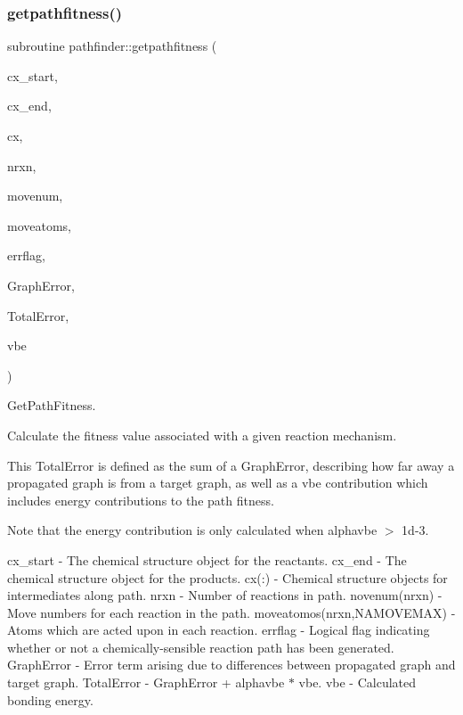 \subsubsection{\texorpdfstring{getpathfitness()}{getpathfitness()}}
{\footnotesize\ttfamily subroutine pathfinder\+::getpathfitness (\begin{DoxyParamCaption}\item[{type(\mbox{\hyperlink{structchemstr_1_1cxs}{cxs}})}]{cx\+\_\+start,  }\item[{type(\mbox{\hyperlink{structchemstr_1_1cxs}{cxs}})}]{cx\+\_\+end,  }\item[{type(\mbox{\hyperlink{structchemstr_1_1cxs}{cxs}}), dimension(nrxn)}]{cx,  }\item[{integer}]{nrxn,  }\item[{integer, dimension(nrxn)}]{movenum,  }\item[{integer, dimension(nrxn,namovemax)}]{moveatoms,  }\item[{logical}]{errflag,  }\item[{real(8)}]{Graph\+Error,  }\item[{real(8)}]{Total\+Error,  }\item[{real(8)}]{vbe }\end{DoxyParamCaption})}



Get\+Path\+Fitness. 

Calculate the fitness value associated with a given reaction mechanism.

This Total\+Error is defined as the sum of a Graph\+Error, describing how far away a propagated graph is from a target graph, as well as a vbe contribution which includes energy contributions to the path fitness.

Note that the energy contribution is only calculated when alphavbe $>$ 1d-\/3.

cx\+\_\+start -\/ The chemical structure object for the reactants. cx\+\_\+end -\/ The chemical structure object for the products. cx(\+:) -\/ Chemical structure objects for intermediates along path. nrxn -\/ Number of reactions in path. novenum(nrxn) -\/ Move numbers for each reaction in the path. moveatomos(nrxn,\+N\+A\+M\+O\+V\+E\+M\+A\+X) -\/ Atoms which are acted upon in each reaction. errflag -\/ Logical flag indicating whether or not a chemically-\/sensible reaction path has been generated. Graph\+Error -\/ Error term arising due to differences between propagated graph and target graph. Total\+Error -\/ Graph\+Error + alphavbe $\ast$ vbe. vbe -\/ Calculated bonding energy. 

